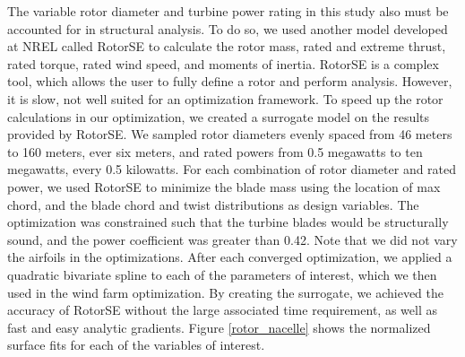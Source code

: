 The variable rotor diameter and turbine power rating in this study also must be accounted for in structural analysis.  To do so, we used another model developed at NREL called RotorSE\cite{ning2013rotorse} to calculate the rotor mass, rated and extreme thrust, rated torque, rated wind speed, and moments of inertia. RotorSE is a complex tool, which allows the user to fully define a rotor and perform analysis. However, it is slow, not well suited for an optimization framework. To speed up the rotor calculations in our optimization, we created a surrogate model on the results provided by RotorSE. We sampled rotor diameters evenly spaced from 46 meters to 160 meters, ever six meters, and rated powers from 0.5 megawatts to ten megawatts, every 0.5 kilowatts. For each combination of rotor diameter and rated power, we used RotorSE to minimize the blade mass using the location of max chord, and the blade chord and twist distributions as design variables. The optimization was constrained such that the turbine blades would be structurally sound, and the power coefficient was greater than 0.42. Note that we did not vary the airfoils in the optimizations. After each converged optimization, we applied a quadratic bivariate spline to each of the parameters of interest, which we then used in the wind farm optimization. By creating the surrogate, we achieved the accuracy of RotorSE without the large associated time requirement, as well as fast and easy analytic gradients. Figure \ref{rotor_nacelle} shows the normalized surface fits for each of the variables of interest.


